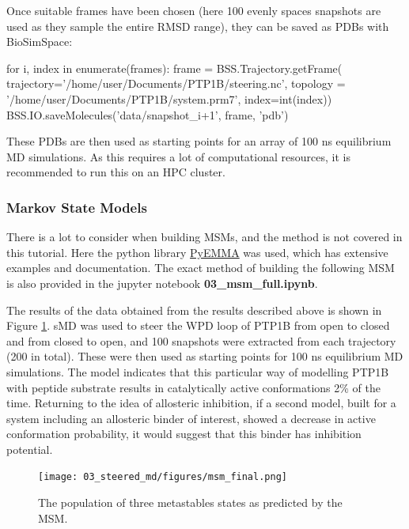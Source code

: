Once suitable frames have been chosen (here 100 evenly spaces snapshots are used as they sample the entire RMSD range), they can be saved as PDBs with BioSimSpace:
\begin{python}
for i, index in enumerate(frames):
    frame = BSS.Trajectory.getFrame(
    trajectory='/home/user/Documents/PTP1B/steering.nc', 
    topology = '/home/user/Documents/PTP1B/system.prm7', 
    index=int(index))
    BSS.IO.saveMolecules('data/snapshot_{i+1}',
                        frame, 'pdb')
\end{python}

These PDBs are then used as starting points for an array of 100 ns equilibrium MD simulations. As this requires a lot of computational resources, it is recommended to run this on an HPC cluster.

\subsubsection{Markov State Models}
There is a lot to consider when building MSMs, and the method is not covered in this tutorial. Here the python library \href{http://emma-project.org/latest/}{PyEMMA} was used, which has extensive examples and documentation. The exact method of building the following MSM is also provided in the jupyter notebook \textbf{03\_msm\_full.ipynb}.

The results of the data obtained from the results described above is shown in Figure \ref{fig:msm}. sMD was used to steer the WPD loop of PTP1B from open to closed and from closed to open, and 100 snapshots were extracted from each trajectory (200 in total). These were then used as starting points for 100 ns equilibrium MD simulations. The model indicates that this particular way of modelling PTP1B with peptide substrate results in catalytically active conformations 2\% of the time. Returning to the idea of allosteric inhibition, if a second model, built for a system including an allosteric binder of interest, showed a decrease in active conformation probability, it would suggest that this binder has inhibition potential. 

\begin{figure}[htp]
    \centering
    \texttt{[image: 03\_steered\_md/figures/msm\_final.png]}
    \caption{The population of three metastables states as predicted by the MSM.}
    \label{fig:msm}
\end{figure}